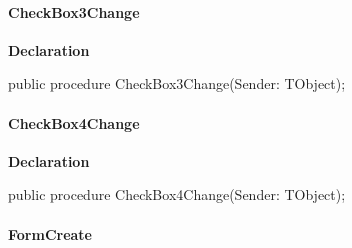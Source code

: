 \documentclass{report}
\newif\ifpdf
\begin{document}
\paragraph*{CheckBox3Change}\hspace*{\fill}

\label{settings.TForm2-CheckBox3Change}
\begin{list}{}{
\setlength{\itemindent}{0cm}
\setlength{\listparindent}{0cm}
\setlength{\leftmargin}{\evensidemargin}
\addtolength{\leftmargin}{\tmplength}
\settowidth{\labelsep}{X}
\addtolength{\leftmargin}{\labelsep}
\setlength{\labelwidth}{\tmplength}
}
\item[\textbf{Declaration}\hfill]
\ifpdf
\begin{flushleft}
\fi
\begin{ttfamily}
public procedure CheckBox3Change(Sender: TObject);\end{ttfamily}

\ifpdf
\end{flushleft}
\fi

\end{list}
\paragraph*{CheckBox4Change}\hspace*{\fill}

\label{settings.TForm2-CheckBox4Change}
\begin{list}{}{
\setlength{\itemindent}{0cm}
\setlength{\listparindent}{0cm}
\setlength{\leftmargin}{\evensidemargin}
\addtolength{\leftmargin}{\tmplength}
\settowidth{\labelsep}{X}
\addtolength{\leftmargin}{\labelsep}
\setlength{\labelwidth}{\tmplength}
}
\item[\textbf{Declaration}\hfill]
\ifpdf
\begin{flushleft}
\fi
\begin{ttfamily}
public procedure CheckBox4Change(Sender: TObject);\end{ttfamily}

\ifpdf
\end{flushleft}
\fi

\end{list}
\paragraph*{FormCreate}\hspace*{\fill}
\end{document}
